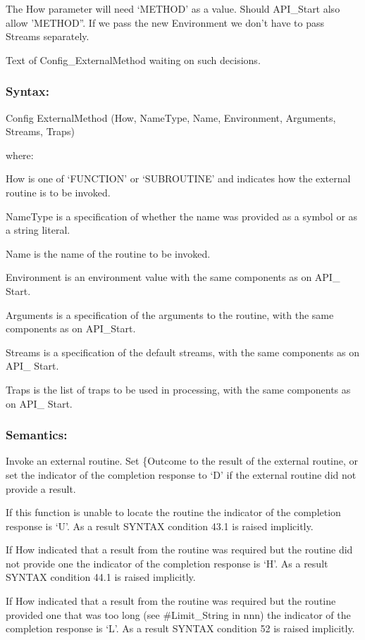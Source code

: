 The How parameter will need `METHOD' as a value. Should API\_Start also
allow 'METHOD''. If we pass the new Environment we don't have to pass
Streams separately.

Text of Config\_ExternalMethod waiting on such decisions.

\subsubsection{Syntax:}\label{syntax-18}

Config ExternalMethod (How, NameType, Name, Environment, Arguments,
Streams, Traps)

where:

How is one of `FUNCTION' or `SUBROUTINE' and indicates how the external
routine is to be invoked.

NameType is a specification of whether the name was provided as a symbol
or as a string literal.

Name is the name of the routine to be invoked.

Environment is an environment value with the same components as on API\_
Start.

Arguments is a specification of the arguments to the routine, with the
same components as on API\_Start.

Streams is a specification of the default streams, with the same
components as on API\_ Start.

Traps is the list of traps to be used in processing, with the same
components as on API\_ Start.

\subsubsection{Semantics:}\label{semantics-19}

Invoke an external routine. Set \{Outcome to the result of the external
routine, or set the indicator of the completion response to `D' if the
external routine did not provide a result.

If this function is unable to locate the routine the indicator of the
completion response is `U'. As a result SYNTAX condition 43.1 is raised
implicitly.

If How indicated that a result from the routine was required but the
routine did not provide one the indicator of the completion response is
`H'. As a result SYNTAX condition 44.1 is raised implicitly.

If How indicated that a result from the routine was required but the
routine provided one that was too long (see \#Limit\_String in nnn) the
indicator of the completion response is `L'. As a result SYNTAX
condition 52 is raised implicitly.

